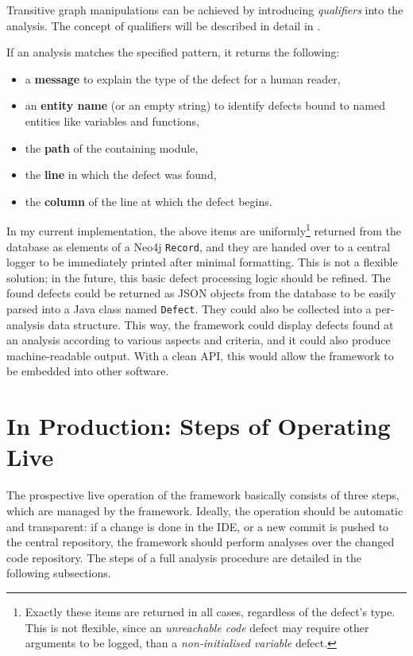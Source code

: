 Transitive graph manipulations can be achieved by introducing \emph{qualifiers} into the analysis. The concept of qualifiers will be described in detail in .

If an analysis matches the specified pattern, it returns the following:

\begin{itemize}
\item a \textbf{message} to explain the type of the defect for a human reader,
\item an \textbf{entity name} (or an empty string) to identify defects bound to named entities like variables and functions,
\item the \textbf{path} of the containing module,
\item the \textbf{line} in which the defect was found,
\item the \textbf{column} of the line at which the defect begins.
\end{itemize}

In my current implementation, the above items are uniformly\footnote{Exactly these items are returned in all cases, regardless of the defect's type. This is not flexible, since an \emph{unreachable code} defect may require other arguments to be logged, than a \emph{non-initialised variable} defect.} returned from the database as elements of a Neo4j \lstinline{Record}, and they are handed over to a central logger to be immediately printed after minimal formatting. This is not a flexible solution; in the future, this basic defect processing logic should be refined. The found defects could be returned as JSON objects from the database to be easily parsed into a Java class named \lstinline{Defect}. They could also be collected into a per-analysis data structure. This way, the framework could display defects found at an analysis according to various aspects and criteria, and it could also produce machine-readable output. With a clean API, this would allow the framework to be embedded into other software.


\section{In Production: Steps of Operating Live}

The prospective live operation of the framework basically consists of three steps, which are managed by the framework. Ideally, the operation should be automatic and transparent: if a change is done in the IDE, or a new commit is pushed to the central repository, the framework should perform analyses over the changed code repository. The steps of a full analysis procedure are detailed in the following subsections.


